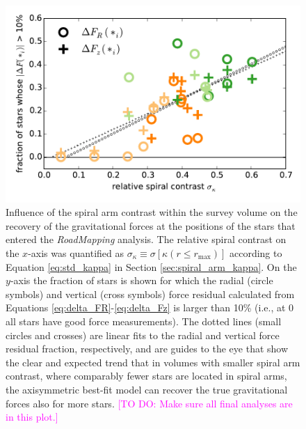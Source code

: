 \documentclass[iop,revtex4,numberedappendix,appendixfloats]{emulateapj}
\newcommand{\RM}{{\sl RoadMapping}}
\newcommand{\Wilma}[1]{\textcolor{Magenta}{#1}}
\begin{document}
\begin{figure}[!htbp]
\centering
\includegraphics[width=\columnwidth]{fig/MNdHHdiffSph2_plot_stdkappa_vs_frac10star_2.pdf}
\caption{Influence of the spiral arm contrast within the survey volume on the recovery of the gravitational forces at the positions of the stars that entered the \RM{} analysis. The relative spiral contrast on the $x$-axis was quantified as $\sigma_\kappa \equiv \sigma[\kappa(r\leq r_\text{max})]$ according to Equation \eqref{eq:std_kappa} in Section \ref{sec:spiral_arm_kappa}. On the $y$-axis the fraction of stars is shown for which the radial (circle symbols) and vertical (cross symbols) force residual calculated from Equations \eqref{eq:delta_FR}-\eqref{eq:delta_Fz} is larger than 10\% (i.e., at $0$ all stars have good force measurements). The dotted lines (small circles and crosses) are linear fits to the radial and vertical force residual fraction, respectively, and are guides to the eye that show the clear and expected trend that in volumes with smaller spiral arm contrast, where comparably fewer stars are located in spiral arms, the axisymmetric best-fit model can recover the true gravitational forces also for more stars. \Wilma{[TO DO: Make sure all final analyses are in this plot.]}}
\label{fig:std_kappa_vs_frac10_stars}
\end{figure}
\end{document}

